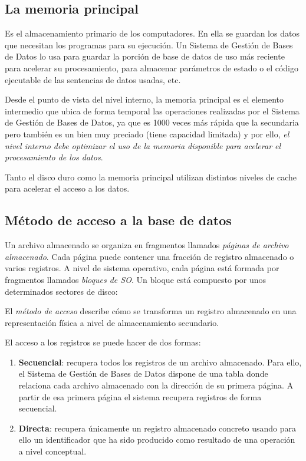 \documentclass[10pt,a4paper,spanish]{report}
\begin{document}
\textcolor[rgb]{1,0.2,0.3}{\subsection{La memoria principal}}
Es el almacenamiento primario de los computadores. En ella se guardan los datos que necesitan los programas para su ejecución. Un Sistema de Gestión de Bases de Datos lo usa para guardar la porción de base de datos de uso más reciente para acelerar su procesamiento, para almacenar parámetros de estado o el código ejecutable de las sentencias de datos usadas, etc.

Desde el punto de vista del nivel interno, la memoria principal es el elemento intermedio que ubica de forma temporal las operaciones realizadas por el Sistema de Gestión de Bases de Datos, ya que es 1000 veces más rápida que la secundaria pero también es un bien muy preciado (tiene capacidad limitada) y por ello, \textit{\textcolor[rgb]{1,0.2,0.3}{el nivel interno debe optimizar el uso de la memoria disponible para acelerar el procesamiento de los datos}}.

Tanto el disco duro como la memoria principal utilizan distintos niveles de cache para acelerar el acceso a los datos.

\newpage
\textcolor[rgb]{1,0.2,0.3}{\section{Método de acceso a la base de datos}}
Un archivo almacenado se organiza en fragmentos llamados \textit{\textcolor[rgb]{1,0.2,0.3}{páginas de archivo almacenado}}. Cada página puede contener una fracción de registro almacenado o varios registros. A nivel de sistema operativo, cada página está formada por fragmentos llamados \textit{\textcolor[rgb]{1,0.2,0.3}{bloques de SO}}. Un bloque está compuesto por unos determinados sectores de disco:

\begin{center}

\end{center}

El \textit{\textcolor[rgb]{1,0.2,0.3}{método de acceso}} describe cómo se transforma un registro almacenado en una representación física  a nivel de almacenamiento secundario. 

El acceso a los registros se puede hacer de dos formas:
\begin{enumerate}[$\heartsuit$]
    \item \textcolor[rgb]{1,0.2,0.3}{\textbf{Secuencial}}: recupera todos los registros de un archivo almacenado. Para ello, el Sistema de Gestión de Bases de Datos dispone de una tabla donde relaciona cada archivo almacenado con la dirección de su primera página. A partir de esa primera página el sistema recupera registros de forma secuencial.

    \item \textcolor[rgb]{1,0.2,0.3}{\textbf{Directa}}: recupera únicamente un registro almacenado concreto usando para ello un identificador que ha sido producido como resultado de una operación a nivel conceptual.
\end{enumerate}
\end{document}
